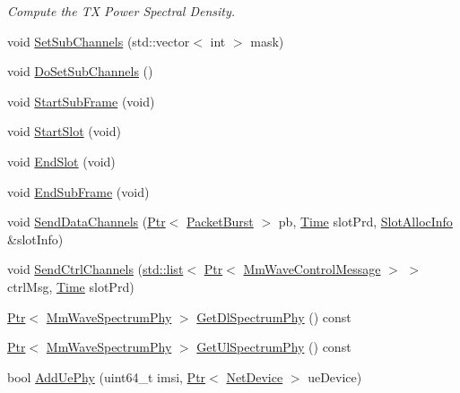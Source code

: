 \begin{DoxyCompactItemize}
\begin{DoxyCompactList}\small\item\em Compute the TX Power Spectral Density. \end{DoxyCompactList}\item 
void \hyperlink{classns3_1_1MmWaveEnbPhy_a9e2456e5312a29007adfab81d5d79379}{Set\+Sub\+Channels} (std\+::vector$<$ int $>$ mask)
\item 
void \hyperlink{classns3_1_1MmWaveEnbPhy_acd2d1215a5618dcd6a2b480a0eda4051}{Do\+Set\+Sub\+Channels} ()
\item 
void \hyperlink{classns3_1_1MmWaveEnbPhy_af066571ea81c9b07cb94f84e5297c11d}{Start\+Sub\+Frame} (void)
\item 
void \hyperlink{classns3_1_1MmWaveEnbPhy_ac0adb365904c29715ad7c1cc39695bca}{Start\+Slot} (void)
\item 
void \hyperlink{classns3_1_1MmWaveEnbPhy_aaea005a7298f69167a554a3c3c03b132}{End\+Slot} (void)
\item 
void \hyperlink{classns3_1_1MmWaveEnbPhy_aac9be87981341e7a6e303ad5d05316a1}{End\+Sub\+Frame} (void)
\item 
void \hyperlink{classns3_1_1MmWaveEnbPhy_a2e177ec4620eeb040bb622ab32bd2432}{Send\+Data\+Channels} (\hyperlink{classns3_1_1Ptr}{Ptr}$<$ \hyperlink{classns3_1_1PacketBurst}{Packet\+Burst} $>$ pb, \hyperlink{classns3_1_1Time}{Time} slot\+Prd, \hyperlink{structns3_1_1SlotAllocInfo}{Slot\+Alloc\+Info} \&slot\+Info)
\item 
void \hyperlink{classns3_1_1MmWaveEnbPhy_a1725bb913c4d82b765005106e47b85cf}{Send\+Ctrl\+Channels} (\hyperlink{openflow-interface_8h_afd9bcfa176617760671b67580f536fa7}{std\+::list}$<$ \hyperlink{classns3_1_1Ptr}{Ptr}$<$ \hyperlink{classns3_1_1MmWaveControlMessage}{Mm\+Wave\+Control\+Message} $>$ $>$ ctrl\+Msg, \hyperlink{classns3_1_1Time}{Time} slot\+Prd)
\item 
\hyperlink{classns3_1_1Ptr}{Ptr}$<$ \hyperlink{classns3_1_1MmWaveSpectrumPhy}{Mm\+Wave\+Spectrum\+Phy} $>$ \hyperlink{classns3_1_1MmWaveEnbPhy_a1fd12ed3e1da54288cf17a1bb9bcdf74}{Get\+Dl\+Spectrum\+Phy} () const 
\item 
\hyperlink{classns3_1_1Ptr}{Ptr}$<$ \hyperlink{classns3_1_1MmWaveSpectrumPhy}{Mm\+Wave\+Spectrum\+Phy} $>$ \hyperlink{classns3_1_1MmWaveEnbPhy_a1cdc19cd9cb5e946d5b7cc54bf4bf9db}{Get\+Ul\+Spectrum\+Phy} () const 
\item 
bool \hyperlink{classns3_1_1MmWaveEnbPhy_adc28805fe2c01c24bc0eea1f767b231f}{Add\+Ue\+Phy} (uint64\+\_\+t imsi, \hyperlink{classns3_1_1Ptr}{Ptr}$<$ \hyperlink{classns3_1_1NetDevice}{Net\+Device} $>$ ue\+Device)

\end{DoxyCompactItemize}
